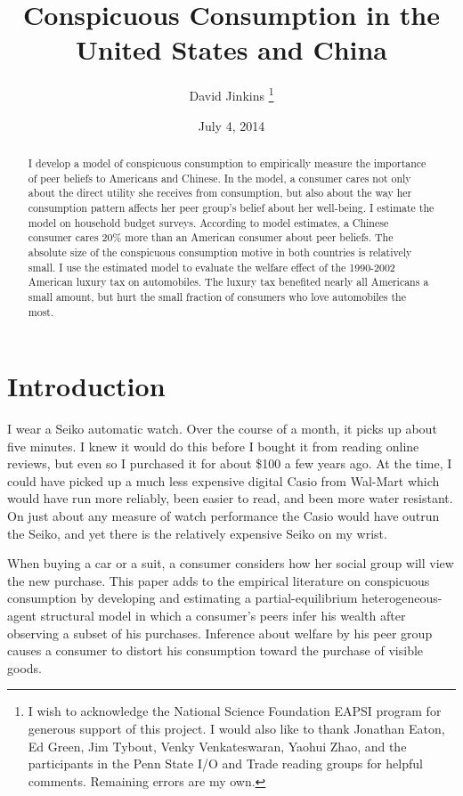 \documentclass[12pt]{article}
\title{Conspicuous Consumption in the United States and China}
\author{David Jinkins
    \thanks{I wish to acknowledge the National Science Foundation EAPSI program for generous support of this project.  I would also like to thank Jonathan Eaton, Ed Green, Jim Tybout, Venky Venkateswaran, Yaohui Zhao, and the participants in the Penn State I/O and Trade reading groups for helpful comments. Remaining errors are my own.}
}
\date{July 4, 2014}
\begin{document}
\maketitle

\begin{abstract}
I develop a model of conspicuous consumption to empirically measure the importance of peer beliefs to Americans and Chinese.  In the model, a consumer cares not only about the direct utility she receives from consumption, but also about the way her consumption pattern affects her peer group's belief about her well-being.  I estimate the model on household budget surveys. According to model estimates, a Chinese consumer cares 20\% more than an American consumer about peer beliefs.  The absolute size of the conspicuous consumption motive in both countries is relatively small.  I use the estimated model to evaluate the welfare effect of the 1990-2002 American luxury tax on automobiles.  The luxury tax benefited nearly all Americans a small amount, but hurt the small fraction of consumers who love automobiles the most. \end{abstract}

\newpage

\section{Introduction}

I wear a Seiko automatic watch.  Over the course of a month, it picks up about five minutes.  I knew it would do this before I bought it from reading online reviews, but even so I purchased it for about \$100 a few years ago.  At the time, I could have picked up a much less expensive digital Casio from Wal-Mart which would have run more reliably, been easier to read, and been more water resistant.  On just about any measure of watch performance the Casio would have outrun the Seiko, and yet there is the relatively expensive Seiko on my wrist.

When buying a car or a suit, a consumer considers how her social group will view the new purchase.  This paper adds to the empirical literature on conspicuous consumption by developing and estimating a partial-equilibrium heterogeneous-agent structural model in which a consumer's peers infer his wealth after observing a subset of his purchases.  Inference about welfare by his peer group causes a consumer to distort his consumption toward the purchase of visible goods.
\end{document}
